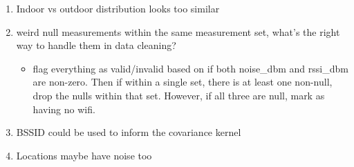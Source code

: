 \documentclass{article}
\begin{document}
\begin{enumerate}
    \item Indoor vs outdoor distribution looks too similar
    \item weird null measurements within the same measurement set, what's the right way to handle them in data cleaning?
    \begin{itemize}
        \item flag everything as valid/invalid based on if both noise\_dbm and rssi\_dbm are non-zero. Then if within a single set, there is at least one non-null, drop the nulls within that set. However, if all three are null, mark as having no wifi. 
    \end{itemize}
    \item BSSID could be used to inform the covariance kernel
    \item Locations maybe have noise too
\end{enumerate}
\end{document}
